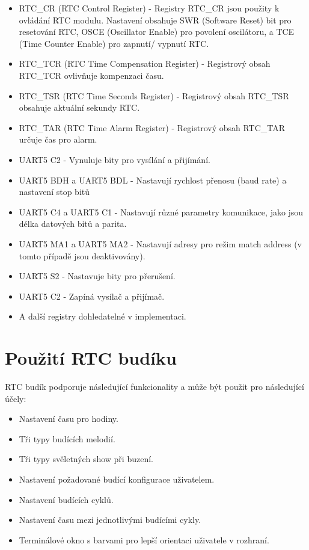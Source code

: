 \documentclass[a4paper, 11pt]{article}
\begin{document}
    \begin{itemize}
        \item RTC\_CR (RTC Control Register) -  Registry RTC\_CR jsou použity k ovládání RTC modulu. Nastavení obsahuje SWR (Software Reset) bit pro resetování RTC, OSCE (Oscillator Enable) pro povolení oscilátoru, a TCE (Time Counter Enable) pro zapnutí/ vypnutí RTC.
        \item RTC\_TCR (RTC Time Compensation Register) - Registrový obsah RTC\_TCR ovlivňuje kompenzaci času.
        \item RTC\_TSR (RTC Time Seconds Register) - Registrový obsah RTC\_TSR obsahuje aktuální sekundy RTC.
        \item RTC\_TAR (RTC Time Alarm Register) - Registrový obsah RTC\_TAR určuje čas pro alarm.
        \item UART5 C2 - Vynuluje bity pro vysílání a přijímání.
        \item UART5 BDH a UART5 BDL - Nastavují rychlost přenosu (baud rate) a nastavení stop bitů
        \item UART5 C4 a UART5 C1 - Nastavují různé parametry komunikace, jako jsou délka datových bitů a parita.
        \item UART5 MA1 a UART5 MA2 - Nastavují adresy pro režim match address (v tomto případě jsou deaktivovány).
        \item UART5 S2 - Nastavuje bity pro přerušení.
        \item UART5 C2 - Zapíná vysílač a přijímač.
        \item  A další registry dohledatelné v implementaci.
    \end{itemize}

    \section{Použití RTC budíku}
    RTC budík podporuje následující funkcionality a může být použit pro následující účely:
        \begin{itemize}
            \item Nastavení času pro hodiny. 
            \item Tři typy budících melodií.
            \item Tři typy svěletných show při buzení.
            \item Nastavení požadované budící konfigurace uživatelem.
            \item Nastavení budících cyklů.
            \item Nastavení času mezi jednotlivými budícími cykly. 
            \item Terminálové okno s barvami pro lepší orientaci uživatele v rozhraní.
            
        \end{itemize}
\end{document}
